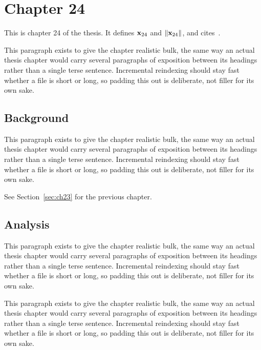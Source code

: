 \section{Chapter 24}
\label{sec:ch24}

This is chapter 24 of the thesis. It defines $\mathbf{x}_{24}$ and $\lVert \mathbf{x}_{24} \rVert$, and cites~\cite{ref1}.

This paragraph exists to give the chapter realistic bulk, the same way an actual thesis chapter would carry several paragraphs of exposition between its headings rather than a single terse sentence. Incremental reindexing should stay fast whether a file is short or long, so padding this out is deliberate, not filler for its own sake.

\subsection{Background}
\label{sec:ch24:background}

This paragraph exists to give the chapter realistic bulk, the same way an actual thesis chapter would carry several paragraphs of exposition between its headings rather than a single terse sentence. Incremental reindexing should stay fast whether a file is short or long, so padding this out is deliberate, not filler for its own sake.

See Section~\ref{sec:ch23} for the previous chapter.

\subsection{Analysis}
\label{sec:ch24:analysis}

This paragraph exists to give the chapter realistic bulk, the same way an actual thesis chapter would carry several paragraphs of exposition between its headings rather than a single terse sentence. Incremental reindexing should stay fast whether a file is short or long, so padding this out is deliberate, not filler for its own sake.

This paragraph exists to give the chapter realistic bulk, the same way an actual thesis chapter would carry several paragraphs of exposition between its headings rather than a single terse sentence. Incremental reindexing should stay fast whether a file is short or long, so padding this out is deliberate, not filler for its own sake.
